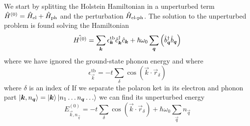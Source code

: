 We start by splitting the Holstein Hamiltonian in a unperturbed term $\hat{H}^{(0)} = \hat{H}_\text{el} + \hat{H}_\text{ph}$ and the perturbation $\hat{H}_\text{el-ph}$.
The solution to the unperturbed problem is found solving the Hamiltonian
\begin{equation}
    \hat{H^{(0)}} = \sum_{\mathbf{\boldsymbol{k}}} \epsilon_{\mathbf{\boldsymbol{k}}}^\text{tb} \hat{c}^\dagger_{\mathbf{\boldsymbol{k}}}\hat{c}_{\mathbf{\boldsymbol{k}}} + \hbar \omega_0\sum_{\mathbf{\boldsymbol{q}}}  \left( \hat{b}^\dagger_{\mathbf{\boldsymbol{q}}} \hat{b}_{\mathbf{\boldsymbol{q}}} \right)
\end{equation}
where we have ignored the ground-state phonon energy and where
\begin{equation}
    \epsilon_\vec{k}^\text{tb} = -t \sum_{    \delta} \cos(\vec{k}\cdot\vec{r}_\delta)
\end{equation}
where $\delta$ is an index of
If we separate the polaron ket in its electron and phonon part
$    \ket{\mathbf{\boldsymbol{k}}, {n_{\mathbf{\boldsymbol{q}}}}} = \ket{\mathbf{\boldsymbol{k}}}\ket{n_1\dots n_{\mathbf{\boldsymbol{q}}} \dots}$ we can find its unperturbed energy
\begin{equation}
    E_{\vec{k}, {n_\vec{q}}}^{(0)} = -t \sum_{    \delta} \cos(\vec{k}\cdot\vec{r}_\delta) + \hbar\omega_0 \sum_\vec{q} n_\vec{q}
\end{equation}
